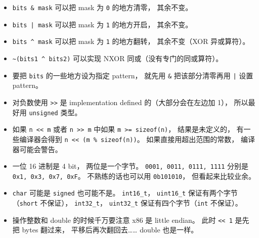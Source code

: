 
\begin{issues}
\issueDraft
\end{issues}

\begin{itemize}
\item \verb|bits & mask| 可以把 mask 为 \verb|0| 的地方清零， 其余不变。
\item \verb`bits | mask` 可以把 mask 为 \verb|1| 的地方开启， 其余不变。
\item \verb|bits ^ mask| 可以把 mask 为 \verb|1| 的地方翻转， 其余不变（XOR 异或算符）。
\item \verb|~(bits1 ^ bits2)| 可以实现 NXOR 同或（没有专门的同或算符）。
\item 要把 \verb|bits| 的一些地方设为指定 pattern， 就先用 \verb|&| 把该部分清零再用 \verb`|` 设置 pattern。
\item 对负数使用 \verb|>>| 是 implementation defined 的（大部分会在左边加 1）， 所以最好用 \verb|unsigned| 类型。
\item 如果 \verb|n << m| 或者 \verb|n >> m| 中如果 \verb|m >= sizeof(n)|， 结果是未定义的， 有一些编译器会得到 \verb|n << (m % sizeof(n))|。 如果直接用超出范围的常数， 编译器可能会警告。
\item 一位 16 进制是 4 bit， 两位是一个字节。 \verb|0001, 0011, 0111, 1111| 分别是 \verb|0x1, 0x3, 0x7, 0xF|。 不熟练的话也可以用 \verb|0b101010|， 但看起来比较业余。
\item \verb|char| 可能是 \verb|signed| 也可能不是。 \verb|int16_t|， \verb|uint16_t| 保证有两个字节（\verb|short| 不保证）， \verb|int32_t|， \verb|uint32_t| 保证有四个字节（\verb|int| 不保证）。
\item 操作整数和 double 的时候千万要注意 x86 是 little endian。 此时 \verb|<< 1| 是先把 bytes 翻过来， 平移后再次翻回去…… double 也是一样。
\end{itemize}
